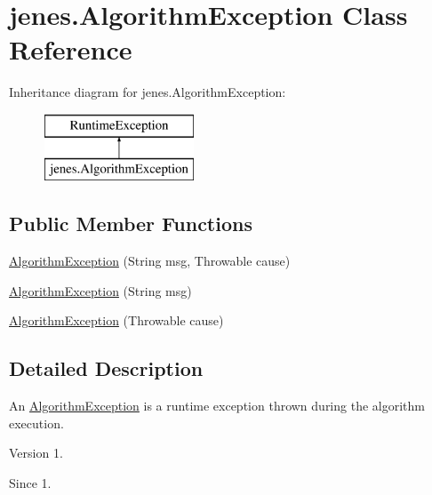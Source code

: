 \hypertarget{classjenes_1_1_algorithm_exception}{\section{jenes.\-Algorithm\-Exception Class Reference}
\label{classjenes_1_1_algorithm_exception}
}
Inheritance diagram for jenes.\-Algorithm\-Exception\-:\begin{figure}[H]
\begin{center}
\leavevmode
\includegraphics[height=2.000000cm]{classjenes_1_1_algorithm_exception}
\end{center}
\end{figure}
\subsection*{Public Member Functions}
\begin{DoxyCompactItemize}
\item 
\hyperlink{classjenes_1_1_algorithm_exception_aa53d271c0db7099eb6fc52c288e05eb0}{Algorithm\-Exception} (String msg, Throwable cause)
\item 
\hyperlink{classjenes_1_1_algorithm_exception_a295c243603f7b36f9ab5b0e1ec22aa60}{Algorithm\-Exception} (String msg)
\item 
\hyperlink{classjenes_1_1_algorithm_exception_ad6906756121d65db53ece1c1d9d8d0db}{Algorithm\-Exception} (Throwable cause)
\end{DoxyCompactItemize}


\subsection{Detailed Description}
An {\ttfamily \hyperlink{classjenes_1_1_algorithm_exception}{Algorithm\-Exception}} is a runtime exception thrown during the algorithm execution.

\begin{DoxyVersion}{Version}
1. 
\end{DoxyVersion}
\begin{DoxySince}{Since}
1. 
\end{DoxySince}


